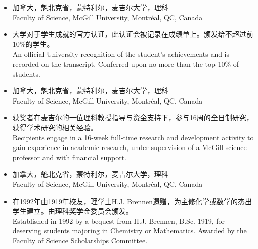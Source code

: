\documentclass[12pt]{CV_CN} %
\begin{document}
\begin{itemize} 
	\item 加拿大，魁北克省，蒙特利尔，麦吉尔大学，理科\\
	Faculty of Science, McGill University, Montr\'eal, QC, Canada
	\item 大学对于学生成就的官方认证，此认证会被记录在成绩单上。颁发给不超过前10\%的学生。\\
	An official University recognition of the student's achievements and is recorded on the transcript. Conferred upon no more than the top 10\% of students.
\end{itemize} 

\begin{itemize} 
	\item 加拿大，魁北克省，蒙特利尔，麦吉尔大学，理科\\
	Faculty of Science, McGill University, Montr\'eal, QC, Canada 
	\item 获奖者在麦吉尔的一位理科教授指导与资金支持下，参与16周的全日制研究，获得学术研究的相关经验。\\
	Recipients engage in a 16-week full-time research and development activity to gain experience in academic research, under supervision of a McGill science professor and with financial support. 
\end{itemize} 

 

\begin{itemize} 
	\item 加拿大，魁北克省，蒙特利尔，麦吉尔大学，理科\\
	Faculty of Science, McGill University, Montr\'eal, QC, Canada
	\item 在1992年由1919年校友，理学士H.J. Brennen遗赠，为主修化学或数学的杰出学生建立。由理科奖学金委员会颁发。\\
	Established in 1992 by a bequest from H.J. Brennen, B.Sc. 1919, for deserving students majoring in Chemistry or Mathematics. Awarded by the Faculty of Science Scholarships Committee.\end{itemize}
\end{document}
